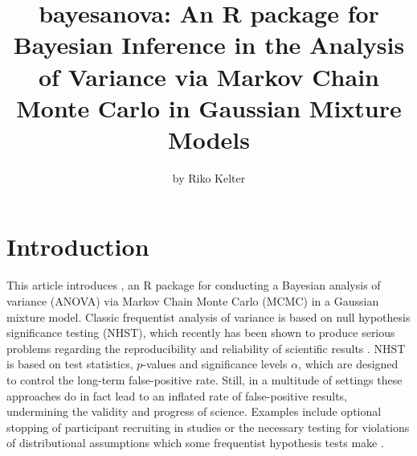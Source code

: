 \title{bayesanova: An R package for Bayesian Inference in the Analysis of Variance via Markov Chain Monte Carlo in Gaussian Mixture Models}
\author{by Riko Kelter}

\maketitle



\section[Introduction]{Introduction} \label{sec:intro}

This article introduces , an R package for conducting a Bayesian analysis of variance (ANOVA) via Markov Chain Monte Carlo (MCMC) in a Gaussian mixture model. Classic frequentist analysis of variance is based on null hypothesis significance testing (NHST), which recently has been shown to produce serious problems regarding the reproducibility and reliability of scientific results \citep{benjaminRedefineStatisticalSignificance, Colquhoun2017, Colquhoun2019, Wasserstein2019, wasserstein2016}. NHST is based on test statistics, $p$-values and significance levels $\alpha$, which are designed to control the long-term false-positive rate. Still, in a multitude of settings these approaches do in fact lead to an inflated rate of false-positive results, undermining the validity and progress of science. Examples include optional stopping of participant recruiting in studies \citep{Carlin2009} or the necessary testing for violations of distributional assumptions which some frequentist hypothesis tests make \citep{Rochon2012}. 

